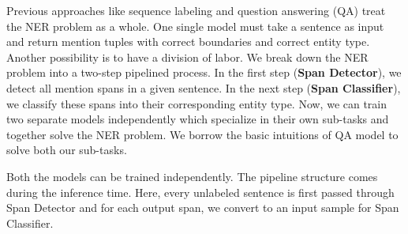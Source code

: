 
Previous approaches like sequence labeling and question answering (QA) treat the NER problem as a whole. One single model must take a sentence as input and return mention tuples with correct boundaries and correct entity type. Another possibility is to have a division of labor. We break down the NER problem into a two-step pipelined process. In the first step (\textbf{Span Detector}), we detect all mention spans in a given sentence. In the next step (\textbf{Span Classifier}), we classify these spans into their corresponding entity type. Now, we can train two separate models independently which specialize in their own sub-tasks and together solve the NER problem. We borrow the basic intuitions of QA model to solve both our sub-tasks.

Both the models can be trained independently. The pipeline structure comes during the inference time. Here, every unlabeled sentence is first passed through Span Detector and for each output span, we convert to an input sample for Span Classifier.
